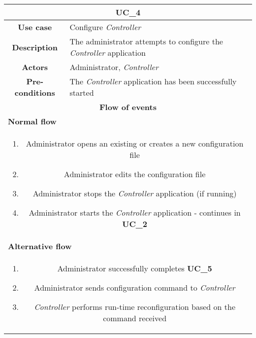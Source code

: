             \vspace{0.5cm}
            \noindent
            \begin{longtable}{ |c|p{11.8cm}| }
                \hline
                \multicolumn{2}{|c|}{\cellcolor{lime} \textbf{UC\_4}}\\ \hline
                \cellcolor[gray]{0.9} \textbf{Use case} & Configure \textit{Controller}\\ \hline
                \cellcolor[gray]{0.9} \textbf{Description} & The administrator attempts to configure the \textit{Controller} application\\ \hline
                \cellcolor[gray]{0.9} \textbf{Actors} & Administrator, \textit{Controller}\\ \hline
                \cellcolor[gray]{0.9} \textbf{Pre-conditions} & The \textit{Controller} application has been successfully started\\ \hline
                \multicolumn{2}{|c|}{\cellcolor[gray]{0.9} \textbf{Flow of events}}\\ \hline
                \multicolumn{2}{|l|}{\cellcolor[gray]{0.9} \textbf{Normal flow}}\\ \hline
                \multicolumn{2}{|p{14cm}|}{
                    \begin{enumerate}
                        \item Administrator opens an existing or creates a new configuration file
                        \item Administrator edits the configuration file
                        \item Administrator stops the \textit{Controller} application (if running)
                        \item Administrator starts the \textit{Controller} application - continues in \textbf{UC\_2}
                    \end{enumerate}
                }\\ \hline
                \multicolumn{2}{|l|}{\cellcolor[gray]{0.9} \textbf{Alternative flow}}\\ \hline
                \multicolumn{2}{|p{14cm}|}{
                    \begin{enumerate}
                        \item Administrator successfully completes \textbf{UC\_5}
                        \item Administrator sends configuration command to \textit{Controller}
                        \item \textit{Controller} performs run-time reconfiguration based on the command received

\end{enumerate}}
\end{longtable}
